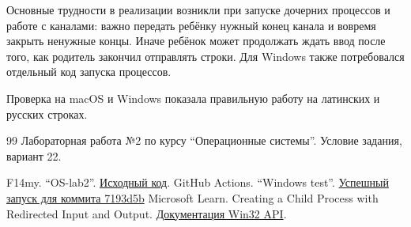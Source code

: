 \documentclass[pdf,unicode,12pt,a4paper,oneside,fleqn]{article}
\begin{document}
Основные трудности в реализации возникли при запуске
дочерних процессов и работе с каналами: важно передать ребёнку нужный конец
канала и вовремя закрыть ненужные концы. Иначе ребёнок может продолжать ждать
ввод после того, как родитель закончил отправлять строки. Для Windows также
потребовался отдельный код запуска процессов.


Проверка на macOS и Windows показала правильную работу на латинских и русских строках.


\begin{thebibliography}{99}
 Лабораторная работа №2 по курсу \enquote{Операционные системы}.
Условие задания, вариант 22.

 F14my. \enquote{OS-lab2}.
\href{https://github.com/F14my/OS-lab2}{Исходный код}.
 GitHub Actions. \enquote{Windows test}.
\href{https://github.com/F14my/OS-lab2/actions/runs/38629281921}{Успешный запуск для коммита 7193d5b}
Microsoft Learn. Creating a Child Process with Redirected Input and Output.
\href{https://learn.microsoft.com/en-us/windows/win32/procthread/creating-a-child-process-with-redirected-input-and-output}
{Документация Win32 API}.
\end{thebibliography}
\end{document}

